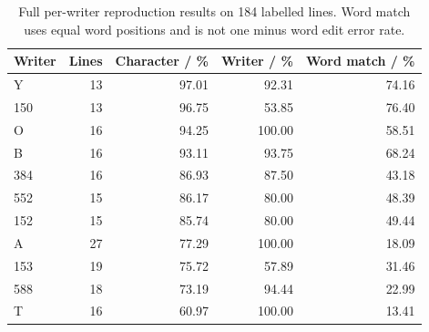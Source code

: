\begin{table}[!htbp]\centering\small
\begin{tabular}{lrrrr}\toprule
\textbf{Writer} & \textbf{Lines} & \textbf{Character / \%} & \textbf{Writer / \%} & \textbf{Word match / \%}\\\midrule
Y & 13 & 97.01 & 92.31 & 74.16\\
150 & 13 & 96.75 & 53.85 & 76.40\\
O & 16 & 94.25 & 100.00 & 58.51\\
B & 16 & 93.11 & 93.75 & 68.24\\
384 & 16 & 86.93 & 87.50 & 43.18\\
552 & 15 & 86.17 & 80.00 & 48.39\\
152 & 15 & 85.74 & 80.00 & 49.44\\
A & 27 & 77.29 & 100.00 & 18.09\\
153 & 19 & 75.72 & 57.89 & 31.46\\
588 & 18 & 73.19 & 94.44 & 22.99\\
T & 16 & 60.97 & 100.00 & 13.41\\
\bottomrule\end{tabular}
\caption{Full per-writer reproduction results on 184 labelled lines. Word match uses equal word positions and is not one minus word edit error rate.}\label{tab:app-r1-writers}
\end{table}
